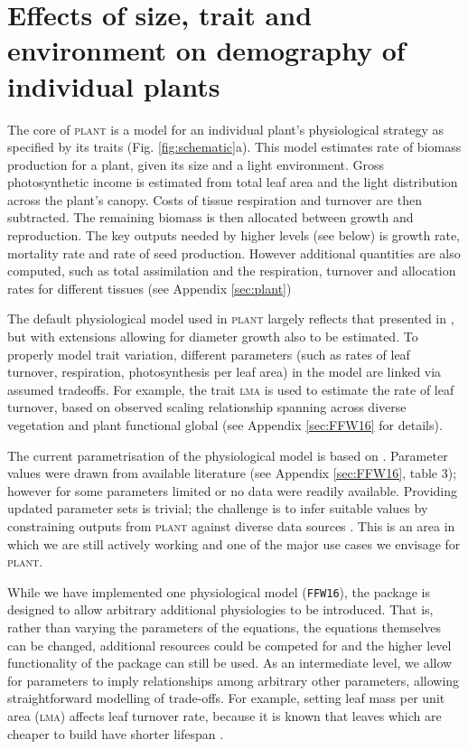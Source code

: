\documentclass[a4paper,11pt]{article}
\newcommand{\plant}{\textsc{plant}}
\begin{document}
\section{Effects of size, trait and environment on demography of individual plants}

The core of {\plant} is a model for an individual plant's
physiological strategy as specified by its traits
(Fig. \ref{fig:schematic}a). This model estimates rate of biomass
production for a plant, given its size and a light environment. Gross
photosynthetic income is estimated from total leaf area and the light
distribution across the plant's canopy. Costs of tissue respiration
and turnover are then subtracted. The remaining biomass is then
allocated between growth and reproduction.  
The key outputs needed by higher levels (see below) is growth rate,
mortality rate and rate of seed production.  However additional
quantities are also computed, such as total assimilation and the
respiration, turnover and allocation rates for different tissues (see
Appendix \ref{sec:plant})

The default physiological model used in {\plant} largely reflects that
presented in \citet{Falster-2011}, but with extensions allowing for
diameter growth also to be estimated. To properly model trait
variation, different parameters (such as rates of leaf turnover,
respiration, photosynthesis per leaf area) in the model are linked via
assumed tradeoffs. For example, the trait \textsc{lma} is used to estimate the
rate of leaf turnover, based on observed scaling relationship spanning
across diverse vegetation and plant functional global
\citep{Wright-2004} (see Appendix \ref{sec:FFW16} for details).

The current parametrisation of the physiological model is based on
\citet{Falster-2011}. Parameter values were drawn from available
literature (see Appendix \ref{sec:FFW16}, table 3); however for some
parameters limited or no data were readily available. Providing
updated parameter sets is trivial; the challenge is to infer suitable
values by constraining outputs from {\plant} against diverse data
sources \citep{Lebauer-2012, Keenan-2013}. This is an area in which we
are still actively working and one of the major use cases we envisage
for {\plant}.

While we have implemented one physiological model (\texttt{FFW16}),
the package is designed to allow arbitrary additional physiologies to
be introduced.  That is, rather than varying the parameters of the
equations, the equations themselves can be changed, additional
resources could be competed for and the higher level functionality of
the package can still be used.  As an intermediate level, we allow for
parameters to imply relationships among arbitrary other parameters,
allowing straightforward modelling of trade-offs.  For example,
setting leaf mass per unit area (\textsc{lma}) affects leaf turnover rate,
because it is known that leaves which are cheaper to build have shorter 
lifespan \citep{Wright-2004}.
\end{document}
